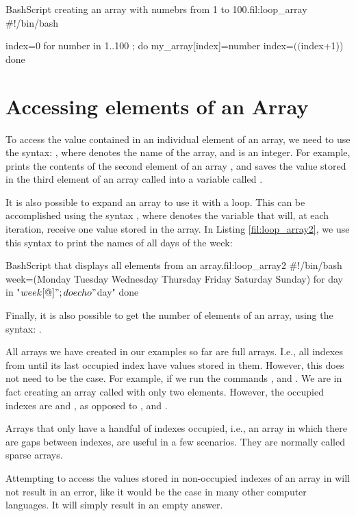 \begin{source_code_float}{Bash}{Script creating an array with numebrs from 1 to 100.}{fil:loop_array}
#!/bin/bash

index=0
for number in {1..100} ; do
    my_array[index]=number
    index=$(($index+1))
done
\end{source_code_float}

\section{Accessing elements of an Array}
To access the value contained in an individual element of an array, we need to use the syntax: , where  denotes the name of the array, and  is an integer. For example,  prints the contents of the second element of an array , and  saves the value stored in the third element of an array called  into a variable called .

It is also possible to expand an array to use it with a  loop. This can be accomplished using the syntax , where  denotes the variable that will, at each iteration, receive one value stored in the array. In Listing \ref{fil:loop_array2}, we use this syntax to print the names of all days of the week:

\begin{source_code_float}{Bash}{Script that displays all elements from an array.}{fil:loop_array2}
#!/bin/bash
week=(Monday Tuesday Wednesday Thursday Friday Saturday Sunday)
for day in "${week[@]}"; do
    echo "$day"
done
\end{source_code_float}
Finally, it is also possible to get the number of elements of an array, using the syntax: .

\begin{my_box}
All arrays we have created in our examples so far are full arrays. I.e., all indexes from  until its last occupied index have values stored in them. However, this does not need to be the case. For example, if we run the commands , and . We are in fact creating an array called  with only two elements. However, the occupied indexes are  and , as opposed to , and .

Arrays that only have a handful of indexes occupied, i.e., an array in which there are gaps between indexes, are useful in a few scenarios. They are normally called sparse arrays. 

Attempting to access the values stored in non-occupied indexes of an array in  will not result in an error, like it would be the case in many other computer languages. It will simply result in an empty answer. 
\end{my_box}


